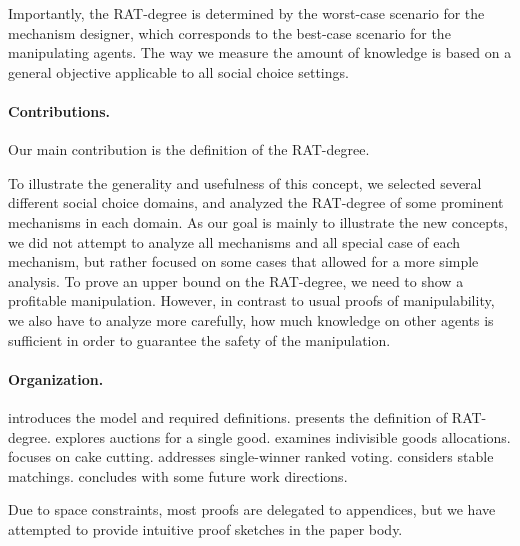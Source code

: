 Importantly, the RAT-degree is determined by the worst-case scenario for the mechanism designer, which corresponds to the best-case scenario for the manipulating agents.
The way we measure the amount of knowledge is based on a general objective applicable to all social choice settings.


\paragraph{Contributions.}
Our main contribution is the definition of the RAT-degree.


To illustrate the generality and usefulness of this concept, we selected several different social choice domains, and analyzed the RAT-degree of some prominent mechanisms in each domain.
As our goal is mainly to illustrate the new concepts, we did not attempt to analyze all mechanisms and all special case of each mechanism, but rather focused on some cases that allowed for a more simple analysis. 
%
To prove an upper bound on the RAT-degree, we need to show a profitable manipulation. However, in contrast to usual proofs of manipulability, we also have to analyze more carefully, how much knowledge on other agents is sufficient in order to guarantee the safety of the manipulation.



\paragraph{Organization.}  introduces the model and required definitions.  presents the definition of RAT-degree. 
%
 explores auctions for a single good.  examines indivisible goods allocations. 
 focuses on cake cutting.  
 addresses single-winner ranked voting.
 considers stable matchings.
 concludes with some future work directions.

Due to space constraints, most proofs are delegated to appendices, but we have attempted to provide intuitive proof sketches in the paper body.

